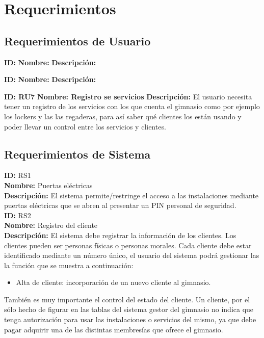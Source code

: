 \chapter*{Requerimientos}\label{cap.requerimientos}


\section{Requerimientos de Usuario}

\textbf{ID: }
\textbf{Nombre: }
\textbf{Descripci\'on: }

\textbf{ID: }
\textbf{Nombre: }
\textbf{Descripci\'on: }

\textbf{ID: RU7}
\textbf{Nombre: Registro se servicios  }
\textbf{Descripci\'on: } El usuario necesita tener un registro de los servicios con los que cuenta el gimnasio como por ejemplo los lockers y las las regaderas,  para así saber qué clientes los están usando y poder llevar un control entre los servicios y clientes.\\



\section{Requerimientos de Sistema}
\textbf{ID: } RS1 \\
\textbf{Nombre:} Puertas eléctricas \\
\textbf{Descripción:} El sistema permite/restringe el acceso a las instalaciones mediante puertas eléctricas que se abren al presentar un PIN personal de seguridad.\\

\textbf{ID: } RS2\\
\textbf{Nombre: }Registro del cliente\\
\textbf{Descripción:} El sistema debe registrar la información de los clientes. Los clientes pueden ser personas físicas o personas morales. Cada cliente debe estar identificado mediante un número único, el usuario del sistema podrá gestionar las la función que se muestra a continuación:\\
	\begin{itemize} 
		\item Alta de cliente: incorporación de un nuevo cliente al gimnasio.
	\end{itemize}
También es muy importante el control del estado del cliente. Un cliente, por el sólo hecho de figurar en las tablas del sistema gestor del gimnasio no indica que tenga autorización para usar las instalaciones o servicios del mismo, ya que debe pagar adquirir una de las distintas membresías que ofrece el gimnasio.\\

